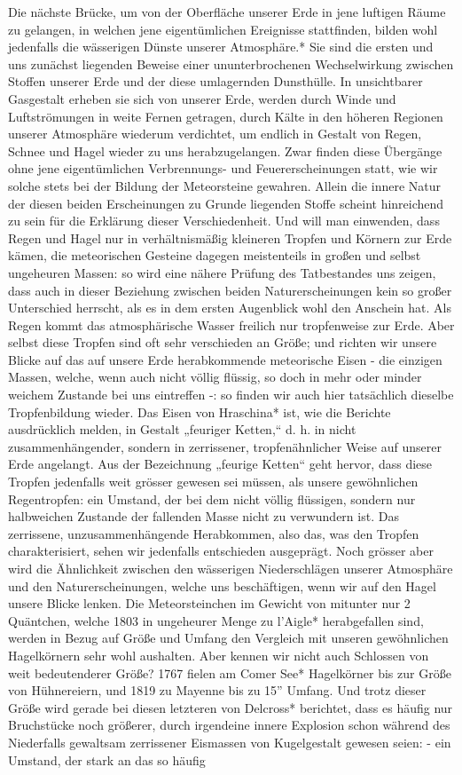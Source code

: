 \documentclass[a4paper, 11pt, oneside, polutonikogreek, german]{article}
\begin{document}
Die nächste Brücke, um von der Oberfläche unserer Erde in jene luftigen Räume zu gelangen, in welchen jene eigentümlichen Ereignisse stattfinden, bilden wohl jedenfalls die wässerigen Dünste unserer Atmosphäre.* Sie sind die ersten und uns zunächst liegenden Beweise einer ununterbrochenen Wechselwirkung zwischen Stoffen unserer Erde und der diese umlagernden Dunsthülle. In unsichtbarer Gasgestalt erheben sie sich von unserer Erde, werden durch Winde und Luftströmungen in weite Fernen getragen, durch Kälte in den höheren Regionen unserer Atmosphäre wiederum verdichtet, um endlich in Gestalt von Regen, Schnee und Hagel wieder zu uns herabzugelangen. Zwar finden diese Übergänge ohne jene eigentümlichen Verbrennungs- und Feuererscheinungen statt, wie wir solche stets bei der Bildung der Meteorsteine gewahren. Allein die innere Natur der diesen beiden Erscheinungen zu Grunde liegenden Stoffe scheint hinreichend zu sein für die Erklärung dieser Verschiedenheit. Und will man einwenden, dass Regen und Hagel nur in verhältnismäßig kleineren Tropfen und Körnern zur Erde kämen, die meteorischen Gesteine dagegen meistenteils in großen und selbst ungeheuren Massen: so wird eine nähere Prüfung des Tatbestandes uns zeigen, dass auch in dieser Beziehung zwischen beiden Naturerscheinungen kein so großer Unterschied herrscht, als es in dem ersten Augenblick wohl den Anschein hat. Als Regen kommt das atmosphärische Wasser freilich nur tropfenweise zur Erde. Aber selbst diese Tropfen sind oft sehr verschieden an Größe; und richten wir unsere Blicke auf das auf unsere Erde herabkommende meteorische Eisen - die einzigen Massen, welche, wenn auch nicht völlig flüssig, so doch in mehr oder minder weichem Zustande bei uns eintreffen -: so finden wir auch hier tatsächlich dieselbe Tropfenbildung wieder. Das Eisen von Hraschina* ist, wie die Berichte ausdrücklich melden, in Gestalt „feuriger Ketten,“ d. h. in nicht zusammenhängender, sondern in zerrissener, tropfenähnlicher Weise auf unserer Erde angelangt. Aus der Bezeichnung „feurige Ketten“ geht hervor, dass diese Tropfen jedenfalls weit grösser gewesen sei müssen, als unsere gewöhnlichen Regentropfen: ein Umstand, der bei dem nicht völlig flüssigen, sondern nur halbweichen Zustande der fallenden Masse nicht zu verwundern ist. Das zerrissene, unzusammenhängende Herabkommen, also das, was den Tropfen charakterisiert, sehen wir jedenfalls entschieden ausgeprägt. Noch grösser aber wird die Ähnlichkeit zwischen den wässerigen Niederschlägen unserer Atmosphäre und den Naturerscheinungen, welche uns beschäftigen, wenn wir auf den Hagel unsere Blicke lenken. Die Meteorsteinchen im Gewicht von mitunter nur 2 Quäntchen, welche 1803 in ungeheurer Menge zu l'Aigle* herabgefallen sind, werden in Bezug auf Größe und Umfang den Vergleich mit unseren gewöhnlichen Hagelkörnern sehr wohl aushalten. Aber kennen wir nicht auch Schlossen von weit bedeutenderer Größe? 1767 fielen am Comer See* Hagelkörner bis zur Größe von Hühnereiern, und 1819 zu Mayenne bis zu 15'' Umfang. Und trotz dieser Größe wird gerade bei diesen letzteren von Delcross* berichtet, dass es häufig nur Bruchstücke noch größerer, durch irgendeine innere Explosion schon während des Niederfalls gewaltsam zerrissener Eismassen von Kugelgestalt gewesen seien: - ein Umstand, der stark an das so häufig 
\end{document}
